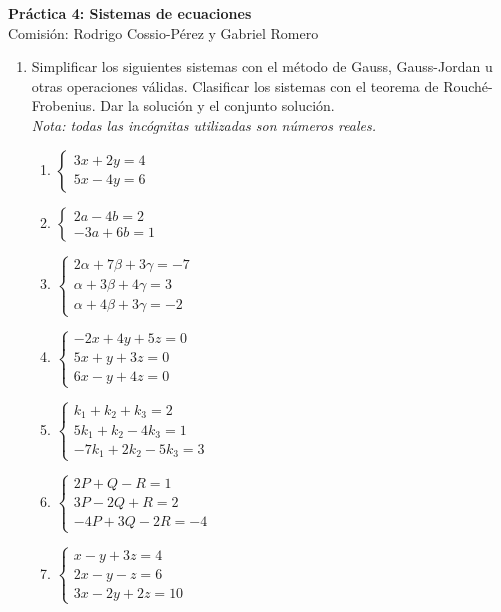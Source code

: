 \documentclass[a4paper]{article}
\newcommand{\exercise}{\item}
\begin{document}
\noindent \hrulefill 
\vspace{-7pt}
\begin{center} 
	\textbf{ Práctica 4: Sistemas de ecuaciones } \\
	Comisión: Rodrigo Cossio-Pérez y Gabriel Romero
\end{center}
\vspace{-10pt}
\hrulefill
\begin{enumerate}
	\exercise Simplificar los siguientes sistemas con el método de Gauss, Gauss-Jordan u otras operaciones válidas. Clasificar los sistemas con el teorema de Rouché-Frobenius. Dar la solución y el conjunto solución. \\ \textit{Nota: todas las incógnitas utilizadas son números reales.}
	\begin{multicols}{2}
	\begin{enumerate} [label=(\alph*)]
		\item $\left\{\begin{matrix} 3x+2y=4\\ 5x-4y=6 \end{matrix}\right.$
		\item $\left\{\begin{matrix} 2a-4b=2\\ -3a+6b=1 \end{matrix}\right.$
		\item $\left\{\begin{matrix} 2\alpha+7\beta+3\gamma=-7 \\ \alpha+3\beta+4\gamma=3 \\ \alpha+4\beta+3\gamma=-2 \end{matrix}\right.$
		\item $\left\{\begin{matrix} -2x+4y+5z=0 \\ 5x+y+3z=0 \\ 6x-y+4z=0 \end{matrix}\right.$
		\item $\left\{\begin{matrix} k_1+k_2+k_3=2 \\ 5k_1+k_2-4k_3=1 \\ -7k_1+2k_2-5k_3=3 \end{matrix}\right.$
		\item $\left\{\begin{matrix} 2P+Q-R=1 \\ 3P-2Q+R=2 \\ -4P+3Q-2R=-4 \end{matrix}\right.$
		\item $\left\{\begin{matrix} x-y+3z=4 \\ 2x-y-z=6 \\ 3x-2y+2z=10 \end{matrix}\right.$

\end{enumerate}
\end{multicols}
\end{enumerate}
\end{document}
